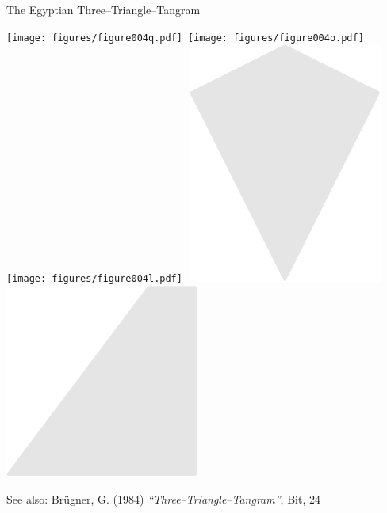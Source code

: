 \documentclass[14pt]{beamer}
\begin{document}
\begin{frame}{The Egyptian Three--Triangle--Tangram}
\begin{center}
            \texttt{[image: figures/figure004q.pdf]}\quad\;\,
            \texttt{[image: figures/figure004o.pdf]}\quad
            \texttt{[image: figures/figure004l.pdf]}\quad\,\,
            \includegraphics[scale=0.240]{figures/figure004j.pdf}\quad\;\,
            \includegraphics[scale=0.240]{figures/figure004g.pdf}\phantom{.}\\

            \bigskip \bigskip

            {\footnotesize See also: Brügner, G. (1984) \emph{``Three--Triangle--Tangram''}, Bit, 24}
        \end{center}
    \end{frame}

\end{document}
